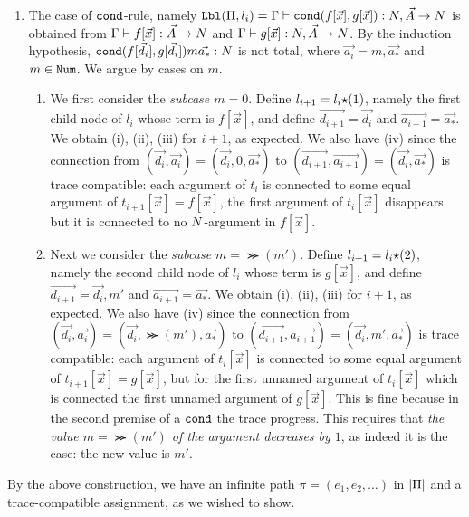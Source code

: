 \documentclass{article}
\newenvironment{proof}[1][Proof]{\begin{trivlist}
\item[\hskip \labelsep {\bfseries #1}]}{\end{trivlist}}
\begin{document}
\begin{proof}
\begin{enumerate}
\item
  The case of ${\tt cond}$-rule, namely
  ${\tt Lbl}(\Pi,l_i) = \Gamma\vdash {\tt cond}(f[\vec{x}],g[\vec{x}]):{N},\vec{A}\rightarrow{N}$
  is obtained from 
  $\Gamma\vdash f[\vec{x}]:\vec{A}\rightarrow{N}$
  and
  $\Gamma\vdash g[\vec{x}]:{N},\vec{A}\rightarrow{N}$. 
  By the induction hypothesis, ${\tt cond}(f[\vec{d_i}],g[\vec{d_i}])m\vec{a_*}:{N}$ is not total,
  where $\vec{a_i} = m,\vec{a_*}$ and $m \in {\tt Num}$. We argue by cases on $m$.
  \begin{enumerate}
  \item
    We first consider the \emph{subcase $m=0$}.
    Define $l_{i+1}=l_i{\star}(1)$, namely the first child node of $l_i$ whose term is $f[\vec{x}]$,
    and define $\vec{d_{i+1}} = \vec{d_i}$ and $\vec{a_{i+1}} = \vec{a_*}$. 
    We obtain (i), (ii), (iii) for $i+1$, as expected. 
    We also have (iv) since the connection from 
    $(\vec{d_i},\vec{a_i}) =(\vec{d_i},0,\vec{a_*})$ to
    $(\vec{d_{i+1}},\vec{a_{i+1}}) = (\vec{d_i},\vec{a_*})$ is trace compatible: 
    each argument of $t_i$ is connected to some equal argument of $t_{i+1}[\vec{x}]=f[\vec{x}]$,
    the first argument of $t_i[\vec{x}]$ disappears but it is connected to no ${N}$-argument in $f[\vec{x}]$.
  \item
    Next we consider the \emph{subcase $m=\Succ(m')$}. 
    Define $l_{i+1}=l_i{\star}(2)$, namely the second child node of $l_i$ whose term is $g[\vec{x}]$,
    and define $\vec{d_{i+1}} = \vec{d_i},m'$ and $\vec{a_{i+1}} = \vec{a_*}$. 
    We obtain (i), (ii), (iii) for $i+1$, as expected.
    We also have (iv) since the connection from 
    $(\vec{d_i},\vec{a_i})
    =(\vec{d_i},\Succ(m'),\vec{a_*})$ to $(\vec{d_{i+1}},\vec{a_{i+1}}) = (\vec{d_i},m',\vec{a_*})$
    is trace compatible: 
    each argument of $t_i[\vec{x}]$ is connected to some equal argument of 
    $t_{i+1}[\vec{x}]=g[\vec{x}]$,
    but for the first unnamed argument of $t_i[\vec{x}]$ 
    which is connected the first unnamed argument of $g[\vec{x}]$.
    This is fine because in the second premise of a ${\tt cond}$ 
    the trace progress. This requires that \emph{the value $m=\Succ(m')$ of the argument decreases by $1$}, 
    as indeed it is the case: the new value is $m'$.
  \end{enumerate}

\end{enumerate}

By the above construction, we have an infinite path $\pi = (e_1,e_2,\ldots)$ in ${|\Pi|}$
and a trace-compatible assignment, as we wished to show.

  
\end{proof}
\end{document}
